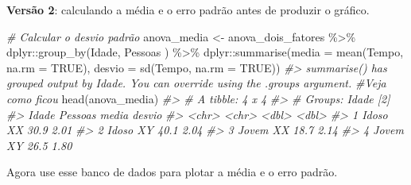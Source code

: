 \documentclass[
]{book}
\newenvironment{Shaded}{\begin{snugshade}}{\end{snugshade}}
\newcommand{\AttributeTok}[1]{\textcolor[rgb]{0.77,0.63,0.00}{#1}}
\newcommand{\CommentTok}[1]{\textcolor[rgb]{0.56,0.35,0.01}{\textit{#1}}}
\newcommand{\ConstantTok}[1]{\textcolor[rgb]{0.00,0.00,0.00}{#1}}
\newcommand{\FunctionTok}[1]{\textcolor[rgb]{0.00,0.00,0.00}{#1}}
\newcommand{\NormalTok}[1]{#1}
\newcommand{\OtherTok}[1]{\textcolor[rgb]{0.56,0.35,0.01}{#1}}
\newcommand{\SpecialCharTok}[1]{\textcolor[rgb]{0.00,0.00,0.00}{#1}}
\begin{document}
\textbf{Versão 2}: calculando a média e o erro padrão antes de produzir o gráfico.

\begin{Shaded}
\begin{Highlighting}[]
\CommentTok{\# Calcular o desvio padrão }
\NormalTok{anova\_media }\OtherTok{\textless{}{-}}\NormalTok{ anova\_dois\_fatores }\SpecialCharTok{\%\textgreater{}\%} 
\NormalTok{    dplyr}\SpecialCharTok{::}\FunctionTok{group\_by}\NormalTok{(Idade, Pessoas ) }\SpecialCharTok{\%\textgreater{}\%} 
\NormalTok{    dplyr}\SpecialCharTok{::}\FunctionTok{summarise}\NormalTok{(}\AttributeTok{media =} \FunctionTok{mean}\NormalTok{(Tempo, }\AttributeTok{na.rm =} \ConstantTok{TRUE}\NormalTok{),}
                     \AttributeTok{desvio =} \FunctionTok{sd}\NormalTok{(Tempo, }\AttributeTok{na.rm =} \ConstantTok{TRUE}\NormalTok{))}
\CommentTok{\#\textgreater{} \textasciigrave{}summarise()\textasciigrave{} has grouped output by \textquotesingle{}Idade\textquotesingle{}. You can override using the \textasciigrave{}.groups\textasciigrave{} argument.}
\CommentTok{\#Veja como ficou }
\FunctionTok{head}\NormalTok{(anova\_media)}
\CommentTok{\#\textgreater{} \# A tibble: 4 x 4}
\CommentTok{\#\textgreater{} \# Groups:   Idade [2]}
\CommentTok{\#\textgreater{}   Idade Pessoas media desvio}
\CommentTok{\#\textgreater{}   \textless{}chr\textgreater{} \textless{}chr\textgreater{}   \textless{}dbl\textgreater{}  \textless{}dbl\textgreater{}}
\CommentTok{\#\textgreater{} 1 Idoso XX       30.9   2.01}
\CommentTok{\#\textgreater{} 2 Idoso XY       40.1   2.04}
\CommentTok{\#\textgreater{} 3 Jovem XX       18.7   2.14}
\CommentTok{\#\textgreater{} 4 Jovem XY       26.5   1.80}
\end{Highlighting}
\end{Shaded}

Agora use esse banco de dados para plotar a média e o erro padrão.
\end{document}

